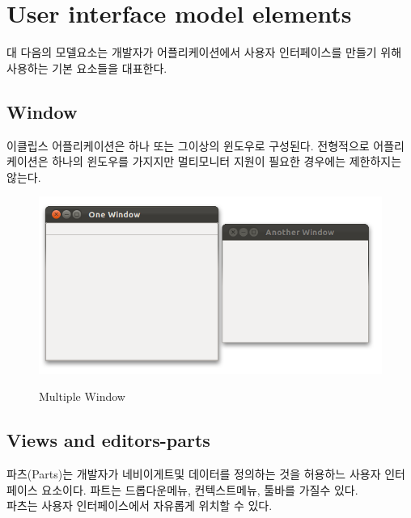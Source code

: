\section{User interface model elements}
\label{sec:2}대
다음의 모델요소는 개발자가 어플리케이션에서 사용자 인터페이스를 만들기 위해 사용하는 기본 요소들을 대표한다.

\subsection{Window}
이클립스 어플리케이션은 하나 또는 그이상의 윈도우로 구성된다. 전형적으로 어플리케이션은 하나의 윈도우를 가지지만 멀티모니터 지원이 필요한 경우에는 제한하지는 않는다. \\

\begin{figure}[hbt]
\centering
\includegraphics[scale=.50]{./image/e4_003}
\label{fig:3}       %
\captionsetup{justification=centering}
\caption{Multiple Window}
\end{figure}

\subsection{Views and editors-parts}
파츠(Parts)는 개발자가 네비이게트및 데이터를 정의하는 것을 허용하느  사용자 인터페이스 요소이다. 파트는 드롭다운메뉴, 컨텍스트메뉴, 툴바를 가질수 있다. \\

파츠는 사용자 인터페이스에서 자유롭게 위치할 수 있다. \\

